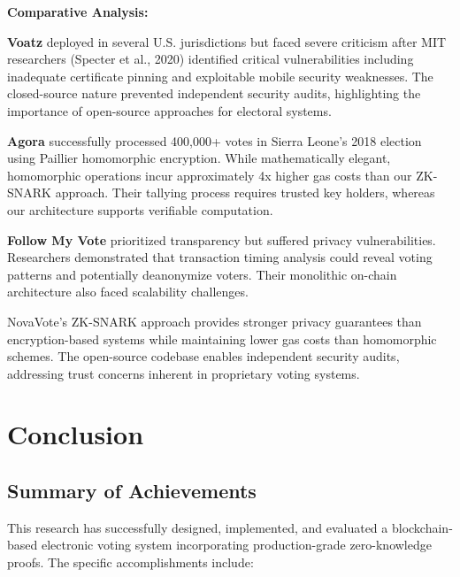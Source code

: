 \documentclass[conference]{IEEEtran}
\begin{document}
\textbf{Comparative Analysis:}

\textbf{Voatz} deployed in several U.S. jurisdictions but faced severe criticism after MIT researchers (Specter et al., 2020) identified critical vulnerabilities including inadequate certificate pinning and exploitable mobile security weaknesses. The closed-source nature prevented independent security audits, highlighting the importance of open-source approaches for electoral systems.

\textbf{Agora} successfully processed 400,000+ votes in Sierra Leone's 2018 election using Paillier homomorphic encryption. While mathematically elegant, homomorphic operations incur approximately 4x higher gas costs than our ZK-SNARK approach. Their tallying process requires trusted key holders, whereas our architecture supports verifiable computation.

\textbf{Follow My Vote} prioritized transparency but suffered privacy vulnerabilities. Researchers demonstrated that transaction timing analysis could reveal voting patterns and potentially deanonymize voters. Their monolithic on-chain architecture also faced scalability challenges.

NovaVote's ZK-SNARK approach provides stronger privacy guarantees than encryption-based systems while maintaining lower gas costs than homomorphic schemes. The open-source codebase enables independent security audits, addressing trust concerns inherent in proprietary voting systems.

\section{Conclusion}

\subsection{Summary of Achievements}

This research has successfully designed, implemented, and evaluated a blockchain-based electronic voting system incorporating production-grade zero-knowledge proofs. The specific accomplishments include:
\end{document}
